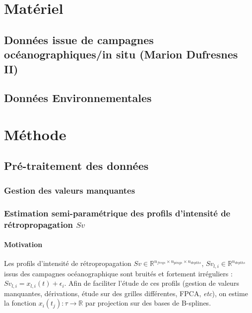 \documentclass{article}
\begin{document}
	\section{Matériel}
	\subsection{Données issue de campagnes océanographiques/in situ (Marion Dufresnes II)}
	\subsection{Données Environnementales}
	
	\clearpage
	\section{Méthode}
	\subsection{Pré-traitement des données}
	\subsubsection{Gestion des valeurs manquantes}
	
	\subsubsection{Estimation semi-paramétrique des profils d'intensité de rétropropagation $Sv$}
	\paragraph{Motivation}
	Les profils d'intensité de rétropropagation $Sv \in \mathbb{R}^{n_{freqs} \times n_{pings} \times n_{depths}}$, $Sv_{l, i} \in \mathbb{R}^{n_{depths}}$ issus des campagnes océanographique sont bruités et fortement irréguliers : $Sv_{l, i} = x_{l,i}(t) + \epsilon_{i}$. 
	Afin de faciliter l'étude de ces profils (gestion de valeurs manquantes, dérivations, étude sur des grilles différentes, FPCA, \textit{etc}), on estime la fonction $x_i (t_j) : \tau \rightarrow \mathbb{R}$ par projection sur des bases de B-splines.
	
\end{document}
